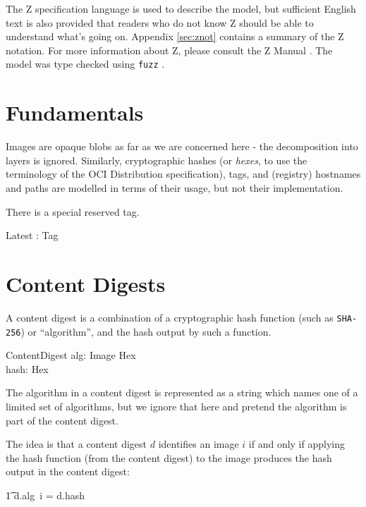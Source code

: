 \documentclass[a4paper,twoside,12pt]{article}
\begin{document}
The Z specification language is used to describe the model, but sufficient English text is also provided that readers who do not know Z should be able to understand what's going on. Appendix \ref{sec:znot} contains a summary of the Z notation.
For more information about Z, please consult the Z Manual \cite{zman}.
The model was type checked using \texttt{fuzz} \cite{fuzz}.

\section{Fundamentals}

Images are opaque blobs as far as we are concerned here - the decomposition into layers is ignored.
Similarly, cryptographic hashes (or \textit{hexes}, to use the terminology of the OCI Distribution specification), tags, and (registry) hostnames and paths are modelled in terms of their usage, but not their implementation.
\begin{zed}
\end{zed}

There is a special reserved tag.
\begin{axdef}
    Latest : Tag
\end{axdef}

\newpage
\section{Content Digests}

A content digest is a combination of a cryptographic hash function (such as \texttt{SHA-256}) or ``algorithm'', and the hash output by such a function. 
\begin{schema}{ContentDigest}
    alg: Image \fun Hex \\
    hash: Hex \\ 
\end{schema}
The algorithm in a content digest is represented as a string which names one of a limited set of algorithms, but we ignore that here
and pretend the algorithm is part of the content digest.

The idea is that a content digest $d$ identifies an image $i$ if and only if applying the hash function (from the content digest) to the image produces the hash output in the content digest:\\
\begin{zed}
\t1 d.alg~i = d.hash
\end{zed}
\end{document}
